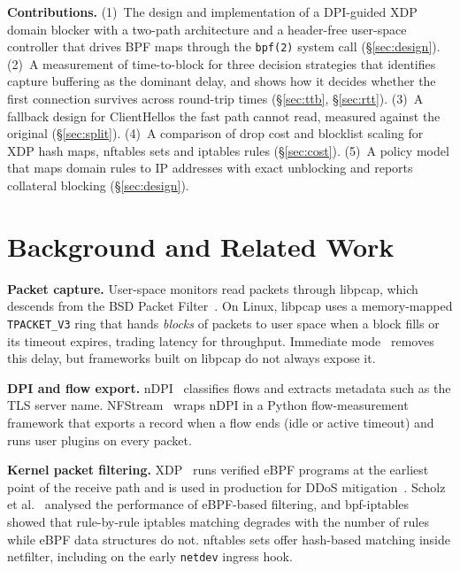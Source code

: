 \documentclass[sigconf,nonacm]{acmart}
\begin{document}
\noindent\textbf{Contributions.} (1)~The design and implementation of a DPI-guided XDP domain
blocker with a two-path architecture and a header-free user-space controller that drives BPF
maps through the \texttt{bpf(2)} system call (\S\ref{sec:design}). (2)~A measurement of
time-to-block for three decision strategies that identifies capture buffering as the dominant
delay, and shows how it decides whether the first connection survives across round-trip times
(\S\ref{sec:ttb}, \S\ref{sec:rtt}). (3)~A fallback design for ClientHellos the fast path cannot
read, measured against the original (\S\ref{sec:split}). (4)~A comparison of drop cost and blocklist scaling for XDP hash maps,
nftables sets and iptables rules (\S\ref{sec:cost}). (5)~A policy model that maps domain rules
to IP addresses with exact unblocking and reports collateral blocking (\S\ref{sec:design}).

\section{Background and Related Work}
\label{sec:background}

\textbf{Packet capture.} User-space monitors read packets through libpcap, which descends from
the BSD Packet Filter~\cite{bpf}. On Linux, libpcap uses a memory-mapped \texttt{TPACKET\_V3}
ring that hands \emph{blocks} of packets to user space when a block fills or its timeout
expires, trading latency for throughput. Immediate mode~\cite{pcapimmediate} removes this delay,
but frameworks built on libpcap do not always expose it.

\textbf{DPI and flow export.} nDPI~\cite{ndpi} classifies flows and extracts metadata such as
the TLS server name. NFStream~\cite{nfstream} wraps nDPI in a Python flow-measurement framework
that exports a record when a flow ends (idle or active timeout) and runs user plugins on every
packet.

\textbf{Kernel packet filtering.} XDP~\cite{xdp} runs verified eBPF programs at the earliest
point of the receive path and is used in production for DDoS mitigation~\cite{bertin}. Scholz et
al.~\cite{scholz} analysed the performance of eBPF-based filtering, and bpf-iptables~\cite{bpfiptables}
showed that rule-by-rule iptables matching degrades with the number of rules while eBPF data
structures do not. nftables sets offer hash-based matching inside netfilter, including on the
early \texttt{netdev} ingress hook.
\end{document}
